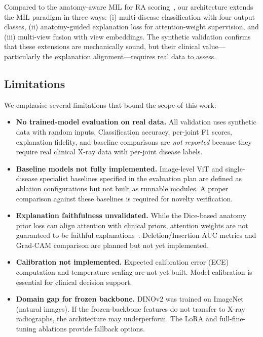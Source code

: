 \documentclass{article}
\begin{document}
Compared to the anatomy-aware MIL for RA scoring~\cite{bo2025}, our architecture extends the MIL paradigm in three ways: (i) multi-disease classification with four output classes, (ii) anatomy-guided explanation loss for attention-weight supervision, and (iii) multi-view fusion with view embeddings. The synthetic validation confirms that these extensions are mechanically sound, but their clinical value---particularly the explanation alignment---requires real data to assess.

\subsection{Limitations}
\label{sec:limitations}

We emphasise several limitations that bound the scope of this work:

\begin{itemize}
  \item \textbf{No trained-model evaluation on real data.} All validation uses synthetic data with random inputs. Classification accuracy, per-joint F1 scores, explanation fidelity, and baseline comparisons are \emph{not reported} because they require real clinical X-ray data with per-joint disease labels.
  \item \textbf{Baseline models not fully implemented.} Image-level ViT and single-disease specialist baselines specified in the evaluation plan are defined as ablation configurations but not built as runnable modules. A proper comparison against these baselines is required for novelty verification.
  \item \textbf{Explanation faithfulness unvalidated.} While the Dice-based anatomy prior loss can align attention with clinical priors, attention weights are not guaranteed to be faithful explanations~\cite{jain2019attention}. Deletion/Insertion AUC metrics and Grad-CAM comparison are planned but not yet implemented.
  \item \textbf{Calibration not implemented.} Expected calibration error (ECE) computation and temperature scaling are not yet built. Model calibration is essential for clinical decision support.
  \item \textbf{Domain gap for frozen backbone.} DINOv2 was trained on ImageNet (natural images). If the frozen-backbone features do not transfer to X-ray radiographs, the architecture may underperform. The LoRA and full-fine-tuning ablations provide fallback options.
\end{itemize}
\end{document}
